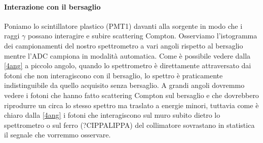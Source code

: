 \paragraph{Interazione con il bersaglio}
Poniamo lo scintillatore plastico (PMT1) davanti alla sorgente in modo che i raggi $\gamma$ possano interagire e subire scattering Compton. Osserviamo l'istogramma dei campionamenti del nostro spettrometro a vari angoli rispetto al bersaglio mentre l'ADC campiona in modalità automatica. 
Come è possibile vedere dalla \autoref{4ang} a piccolo angolo, quando lo spettrometro è direttamente attraversato dai fotoni che non interagiscono con il bersaglio, lo spettro è praticamente indistinguibile da quello acquisito senza bersaglio. A grandi angoli dovremmo vedere i fotoni che hanno fatto scattering Compton sul bersaglio e che dovrebbero riprodurre un circa lo stesso spettro ma traslato a energie minori, tuttavia come è chiaro dalla  \autoref{4ang} i fotoni che interagiscono sul muro subito dietro lo spettrometro o sul ferro (?CIPPALIPPA) del collimatore sovrastano in statistica il segnale che vorremmo osservare.

